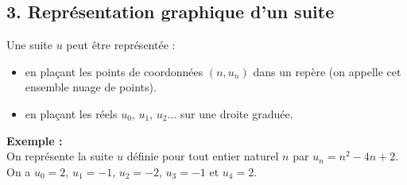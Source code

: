\documentclass[11pt,a4paper]{article}
\begin{document}
\newpage

\subsection*{3. Représentation graphique d'un suite}


Une suite $u$ peut être représentée :
\vspace{-4pt}
\begin{itemize}
  \item en plaçant les points de coordonnées $(n, u_n)$ dans un repère (on appelle cet ensemble nuage de points).
  \item en plaçant les réels $u_0$, $u_1$, $u_2\dots$ sur une droite graduée.
\end{itemize}


\textbf{Exemple :} ~\\
On représente la suite $u$ définie pour tout entier naturel $n$ par $u_n=n^2-4n+2$.\\
On a  $u_0=2$, $u_1=-1$, $u_2=-2$, $u_3=-1$ et $u_4=2$. \\
\end{document}
